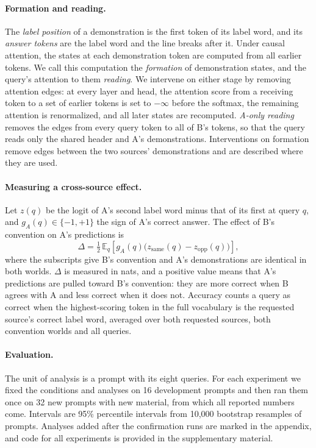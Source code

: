 \documentclass[11pt]{article}
\begin{document}
\paragraph{Formation and reading.}
The \emph{label position} of a demonstration is the first token of its label word, and its \emph{answer tokens} are the label word and the line breaks after it.
Under causal attention, the states at each demonstration token are computed from all earlier tokens.
We call this computation the \emph{formation} of demonstration states, and the query's attention to them \emph{reading}.
We intervene on either stage by removing attention edges: at every layer and head, the attention score from a receiving token to a set of earlier tokens is set to $-\infty$ before the softmax, the remaining attention is renormalized, and all later states are recomputed.
\emph{A-only reading} removes the edges from every query token to all of B's tokens, so that the query reads only the shared header and A's demonstrations.
Interventions on formation remove edges between the two sources' demonstrations and are described where they are used.

\paragraph{Measuring a cross-source effect.}
Let $z(q)$ be the logit of A's second label word minus that of its first at query $q$, and $g_A(q)\in\{-1,+1\}$ the sign of A's correct answer.
The effect of B's convention on A's predictions is
\begin{equation}
\Delta = \tfrac{1}{2}\,\mathbb{E}_q\!\left[g_A(q)\big(z_{\text{same}}(q)-z_{\text{opp}}(q)\big)\right],
\label{eq:delta}
\end{equation}
where the subscripts give B's convention and A's demonstrations are identical in both worlds.
$\Delta$ is measured in nats, and a positive value means that A's predictions are pulled toward B's convention: they are more correct when B agrees with A and less correct when it does not.
Accuracy counts a query as correct when the highest-scoring token in the full vocabulary is the requested source's correct label word, averaged over both requested sources, both convention worlds and all queries.

\paragraph{Evaluation.}
The unit of analysis is a prompt with its eight queries.
For each experiment we fixed the conditions and analyses on 16 development prompts and then ran them once on 32 new prompts with new material, from which all reported numbers come.
Intervals are 95\% percentile intervals from 10{,}000 bootstrap resamples of prompts.
Analyses added after the confirmation runs are marked in the appendix, and code for all experiments is provided in the supplementary material.
\end{document}
